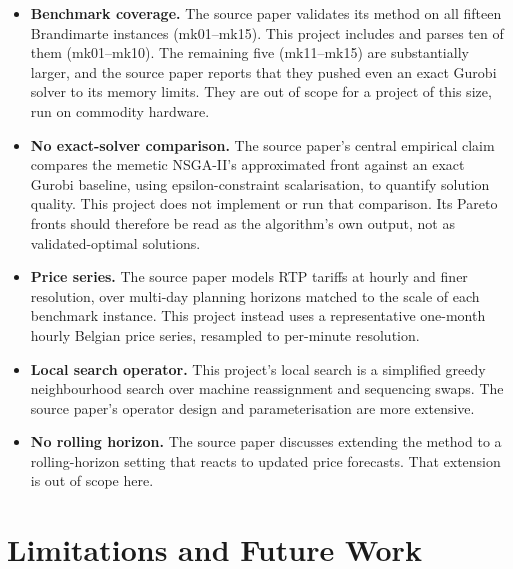 \documentclass[11pt,a4paper]{article}
\begin{document}
\begin{itemize}
    \item \textbf{Benchmark coverage.} The source paper validates its method on all fifteen
    Brandimarte instances (mk01--mk15). This project includes and parses ten of them (mk01--mk10).
    The remaining five (mk11--mk15) are substantially larger, and the source paper reports that they
    pushed even an exact Gurobi solver to its memory limits. They are out of scope for a project of
    this size, run on commodity hardware.
    \item \textbf{No exact-solver comparison.} The source paper's central empirical claim compares
    the memetic NSGA-II's approximated front against an exact Gurobi baseline, using
    epsilon-constraint scalarisation, to quantify solution quality. This project does not implement
    or run that comparison. Its Pareto fronts should therefore be read as the algorithm's own output,
    not as validated-optimal solutions.
    \item \textbf{Price series.} The source paper models RTP tariffs at hourly and finer resolution,
    over multi-day planning horizons matched to the scale of each benchmark instance. This project
    instead uses a representative one-month hourly Belgian price series, resampled to per-minute
    resolution.
    \item \textbf{Local search operator.} This project's local search is a simplified greedy
    neighbourhood search over machine reassignment and sequencing swaps. The source paper's operator
    design and parameterisation are more extensive.
    \item \textbf{No rolling horizon.} The source paper discusses extending the method to a
    rolling-horizon setting that reacts to updated price forecasts. That extension is out of scope
    here.
\end{itemize}

\section{Limitations and Future Work}
\label{sec:limitations}
\end{document}
